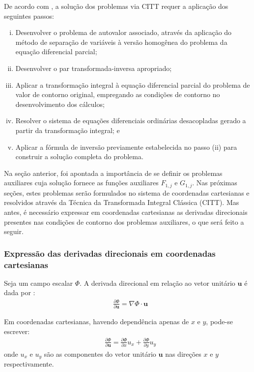 De acordo com \cite{livro_cotta}, a solução dos problemas via CITT requer a aplicação dos seguintes passos:
\begin{enumerate}[(i)]
	\item Desenvolver o problema de autovalor associado, através da aplicação do método de separação de variáveis à versão homogênea do problema da equação
	diferencial parcial;
	\item Desenvolver o par transformada-inversa apropriado;
	\item Aplicar a transformação integral à equação diferencial parcial do problema de valor de contorno original, empregando as condições de contorno no
	desenvolvimento dos cálculos;
	\item Resolver o sistema de equações diferenciais ordinárias desacopladas gerado a partir da transformação integral; e
	\item Aplicar a fórmula de inversão previamente estabelecida no passo (ii) para construir a solução completa do problema.
\end{enumerate}

Na seção anterior, foi apontada a importância de se definir os problemas auxiliares cuja solução fornece as funções auxiliares $F_{1,j}$ e $G_{1,j}$.
Nas próximas seções, estes problemas serão formulados no sistema de coordenadas cartesianas e resolvidos através da Técnica da Transformada Integral Clássica (CITT). Mas antes, é necessário
expressar em coordenadas cartesianas as derivadas direcionais presentes nas condições de contorno dos problemas auxiliares, o que
será feito a seguir.

\subsubsection{Expressão das derivadas direcionais em coordenadas cartesianas}\label{secao_sobre_normal}
Seja um campo escalar $\Phi$. A derivada direcional em relação ao vetor unitário $\mathbf{u}$ é dada por \citep{livro_stewart}:
\begin{align}
& \frac{\partial\Phi}{\partial\mathbf{u}} = \nabla \Phi \cdot \mathbf{u} 
\end{align} 

Em coordenadas cartesianas, havendo dependência apenas de $x$ e $y$, pode-se escrever:
\begin{align}
& \frac{\partial\Phi}{\partial\mathbf{u}} = \frac{\partial \Phi}{\partial x}u_x + \frac{\partial \Phi}{\partial y}u_y\label{derivada_direcional_coodernadas_cartesianas}
\end{align}
onde $u_x$ e $u_y$ são as componentes do vetor unitário $\mathbf{u}$ nas direções $x$ e $y$ respectivamente.

